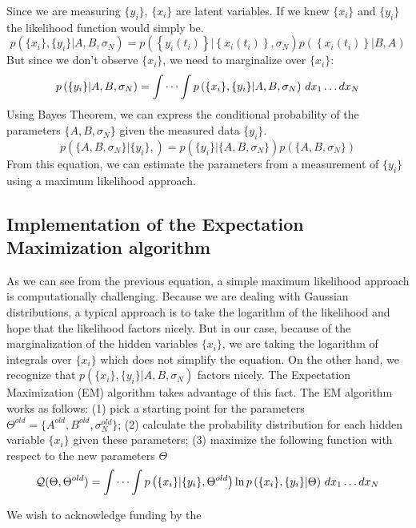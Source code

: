 \documentclass[%
 reprint,
 amsmath,amssymb,
 aps,
]{revtex4-1}
\begin{document}
Since we are measuring $\{y_{i}\}$, $\{x_{i}\}$ are latent variables.  If we knew $\{x_{i}\}$ and $\{y_{i}\}$ the likelihood function would simply be.
\begin{equation}
	p\left( \{x_{i}\},\{y_{i}\}|A,B,\sigma_{N}\right) = 
	p\left( \left\{y_i(t_i)\right\} \left| \left\{x_i(t_i)\right\},\sigma_{N} \right.\right)
	p\left( \left\{x_i(t_i)\right\} \left| B, A \right.\right)
\end{equation}
But since we don't observe $\{x_{i}\}$, we need to marginalize over $\{x_{i}\}$:
\begin{equation}
p\left( \{y_{i}\}|A,B,\sigma_{N}\right) = \idotsint p\left( \{x_{i}\},\{y_{i}\}|A,B,\sigma_{N}\right) \,dx_1 \dots dx_N
\end{equation}
Using Bayes Theorem, we can express the conditional probability of the parameters $\{A,B,\sigma_{N}\}$ given the measured data $\{y_{i}\}$.
\begin{equation}
	p\left( \{A,B,\sigma_{N}\}|\{y_{i}\},\right) =
	p\left( \{y_{i}\}|\{A,B,\sigma_{N}\}\right)p\left(\{A,B,\sigma_{N}\}\right)
\end{equation}
From this equation, we can estimate the parameters from a measurement of $\{y_{i}\}$ using a maximum likelihood approach.
\subsection{Implementation of the Expectation Maximization algorithm}
As we can see from the previous equation, a simple maximum likelihood approach is computationally challenging.  Because we are dealing with Gaussian distributions, a typical approach is to take the logarithm of the likelihood and hope that the likelihood factors nicely.  But in our case, because of the marginalization of the hidden variables $\{x_{i}\}$, we are taking the logarithm of integrals over $\{x_{i}\}$ which does not simplify the equation.  On the other hand, we recognize that $p\left( \{x_{i}\},\{y_{i}\}|A,B,\sigma_{N}\right)$ factors nicely.  The Expectation Maximization (EM) algorithm takes advantage of this fact.  The EM algorithm works as follows: (1) pick a starting point for the parameters $\Theta^{old} = \{A^{old},B^{old},\sigma_{N}^{old}\}$; (2) calculate the probability distribution for each hidden variable $\{x_{i}\}$ given these parameters; (3) maximize the following function with respect to the new parameters $\Theta$
\begin{equation}
	\mathcal{Q}(\Theta,\Theta^{old}) = \idotsint p\left( \{x_{i}\}|\{y_{i}\},\Theta^{old}\right)\ln p\left( \{x_{i}\},\{y_{i}\}|\Theta\right)\,dx_1 \dots dx_N
\end{equation}

\begin{acknowledgments}
We wish to acknowledge funding by the 
\end{acknowledgments}
\end{document}
